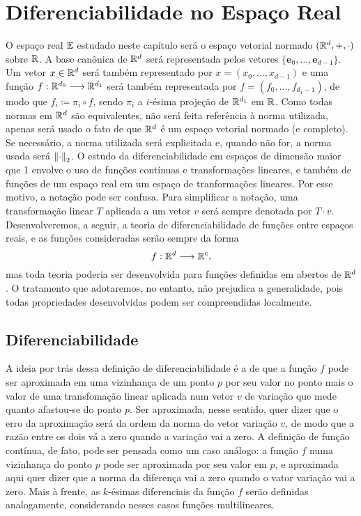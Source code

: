 \chapter{Diferenciabilidade no Espaço Real}

O espaço real $\mathbb{E}$ estudado neste capítulo será o espaço vetorial normado $(\mathbb{R}^d,+,\cdot)$ sobre $\mathbb{R}$. A base canônica de $\mathbb{R}^d$ será representada pelos vetores $\{\bm e_0, \ldots, \bm e_{d-1}\}$. Um vetor $x \in \mathbb{R}^d$ será também representado por $x=(x_0,\ldots,x_{d-1})$ e uma função $f: \mathbb{R}^{d_0} \longrightarrow \mathbb{R}^{d_1}$ será também representada por $f=(f_0,\ldots,f_{d_1-1})$, de modo que $f_i \coloneqq \pi_i \circ f$, sendo $\pi_i$ a $i$-ésima projeção de $\mathbb{R}^{d_1}$ em $\mathbb{R}$. Como todas normas em $\mathbb{R}^d$ são equivalentes, não será feita referência à norma utilizada, apenas será usado o fato de que $\mathbb{R}^d$ é um espaço vetorial normado (e completo). Se necessário, a norma utilizada será explicitada e, quando não for, a norma usada será $\left\Vert{\cdot}\right\Vert_2$. O estudo da diferenciabilidade em espaços de dimensão maior que 1 envolve o uso de funções contínuas e transformações lineares, e também de funções de um espaço real em um espaço de tranformações lineares. Por esse motivo, a notação pode ser confusa. Para simplificar a notação, uma transformação linear $T$ aplicada a um vetor $v$ será sempre denotada por $T \cdot v$. Desenvolveremos, a seguir, a teoria de diferenciabilidade de funções entre espaços reais, e as funções consideradas serão sempre da forma
	\begin{equation*}
	f: \mathbb{R}^d \longrightarrow \mathbb{R}^c,
	\end{equation*}
mas toda teoria poderia ser desenvolvida para funções definidas em abertos de $\mathbb{R}^d$. O tratamento que adotaremos, no entanto, não prejudica a generalidade, pois todas propriedades desenvolvidas podem ser compreendidas localmente.

\section{Diferenciabilidade}

A ideia por trás dessa definição de diferenciabilidade é a de que a função $f$ pode ser aproximada em uma vizinhança de um ponto $p$ por seu valor no ponto mais o valor de uma transfomação linear aplicada num vetor $v$ de variação que mede quanto afastou-se do ponto $p$. Ser aproximada, nesse sentido, quer dizer que o erro da aproximação será da ordem da norma do vetor variação $v$, de modo que a razão entre os dois vá a zero quando a variação vai a zero. A definição de função contínua, de fato, pode ser pensada como um caso análogo: a função $f$ numa vizinhança do ponto $p$ pode ser aproximada por seu valor em $p$, e aproximada aqui quer dizer que a norma da diferença vai a zero quando o vator variação vai a zero. Mais à frente, as $k$-ésimas diferenciais da função $f$ serão definidas analogamente, considerando nesses casos funções multilineares.

